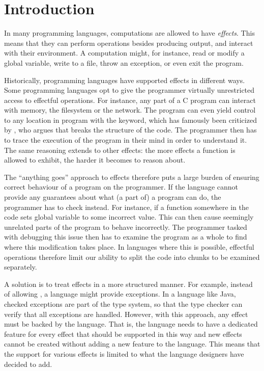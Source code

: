 \chapter{Introduction}\label{chap:introduction}

In many programming languages, computations are allowed to have \emph{effects}. This means that they can perform operations besides producing output, and interact with their environment. A computation might, for instance, read or modify a global variable, write to a file, throw an exception, or even exit the program.

Historically, programming languages have supported effects in different ways. Some programming languages opt to give the programmer virtually unrestricted access to effectful operations. For instance, any part of a C program can interact with memory, the filesystem or the network. The program can even yield control to any location in program with the  keyword, which has famously been criticized by \textcite{dijkstra_letters_1968}, who argues that  breaks the structure of the code. The programmer then has to trace the execution of the program in their mind in order to understand it. The same reasoning extends to other effects: the more effects a function is allowed to exhibit, the harder it becomes to reason about.

The ``anything goes'' approach to effects therefore puts a large burden of ensuring correct behaviour of a program on the programmer. If the language cannot provide any guarantees about what (a part of) a program can do, the programmer has to check instead. For instance, if a function somewhere in the code sets global variable to some incorrect value. This can then cause seemingly unrelated parts of the program to behave incorrectly. The programmer tasked with debugging this issue then has to examine the program as a whole to find where this modification takes place. In languages where this is possible, effectful operations therefore limit our ability to split the code into chunks to be examined separately.

A solution is to treat effects in a more structured manner. For example, instead of allowing , a language might provide exceptions. In a language like Java, checked exceptions are part of the type system, so that the type checker can verify that all exceptions are handled. However, with this approach, any effect must be backed by the language. That is, the language needs to have a dedicated feature for every effect that should be supported in this way and new effects cannot be created without adding a new feature to the language. This means that the support for various effects is limited to what the language designers have decided to add.

